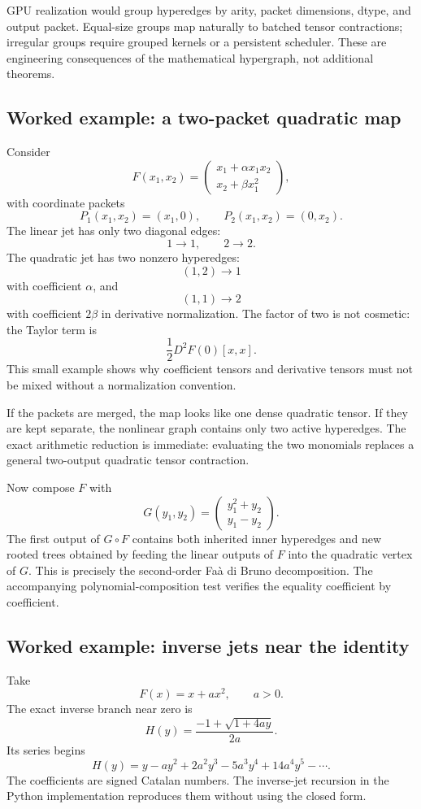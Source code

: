 \documentclass[11pt]{article}
\theoremstyle{definition}
\theoremstyle{remark}
\begin{document}
GPU realization would group hyperedges by arity, packet dimensions, dtype, and output packet.  Equal-size groups map naturally to batched tensor contractions; irregular groups require grouped kernels or a persistent scheduler.  These are engineering consequences of the mathematical hypergraph, not additional theorems.

\subsection{Worked example: a two-packet quadratic map}

Consider
\[
F(x_1,x_2)
=
\begin{pmatrix}
x_1+\alpha x_1x_2\\
x_2+\beta x_1^2
\end{pmatrix},
\]
with coordinate packets
\[
P_1(x_1,x_2)=(x_1,0),
\qquad
P_2(x_1,x_2)=(0,x_2).
\]
The linear jet has only two diagonal edges:
\[
1\to1,
\qquad
2\to2.
\]
The quadratic jet has two nonzero hyperedges:
\[
(1,2)\to1
\]
with coefficient $\alpha$, and
\[
(1,1)\to2
\]
with coefficient $2\beta$ in derivative normalization.  The factor of two is not cosmetic: the Taylor term is
\[
\frac12D^2F(0)[x,x].
\]
This small example shows why coefficient tensors and derivative tensors must not be mixed without a normalization convention.

If the packets are merged, the map looks like one dense quadratic tensor.  If they are kept separate, the nonlinear graph contains only two active hyperedges.  The exact arithmetic reduction is immediate: evaluating the two monomials replaces a general two-output quadratic tensor contraction.

Now compose $F$ with
\[
G(y_1,y_2)
=
\begin{pmatrix}
y_1^2+y_2\\
y_1-y_2
\end{pmatrix}.
\]
The first output of $G\circ F$ contains both inherited inner hyperedges and new rooted trees obtained by feeding the linear outputs of $F$ into the quadratic vertex of $G$.  This is precisely the second-order Fa\`a di Bruno decomposition.  The accompanying polynomial-composition test verifies the equality coefficient by coefficient.

\subsection{Worked example: inverse jets near the identity}

Take
\[
F(x)=x+ax^2,
\qquad a>0.
\]
The exact inverse branch near zero is
\[
H(y)
=
\frac{-1+\sqrt{1+4ay}}{2a}.
\]
Its series begins
\[
H(y)
=
y-ay^2+2a^2y^3-5a^3y^4+14a^4y^5-\cdots.
\]
The coefficients are signed Catalan numbers.  The inverse-jet recursion in the Python implementation reproduces them without using the closed form.
\end{document}
